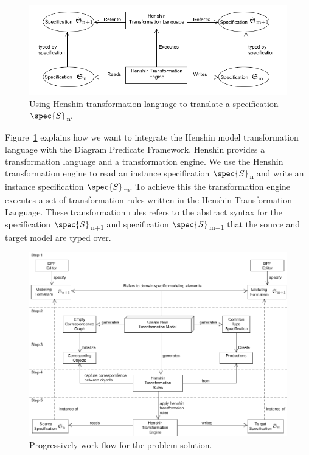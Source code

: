 \begin{figure}[H]
	\centering
	\includegraphics[scale=0.7]{./Figures/TransformationSolutionBasic.png}
	\caption[Integrating Henshin with DPF]
	{Using Henshin transformation language to translate a specification
	$\spec{S}$\textsubscript{n}.}
	\label{fig:Simple_Solution}
\end{figure}


Figure~\ref{fig:Simple_Solution} explains how we want to integrate the Henshin
model transformation language with the Diagram Predicate Framework. Henshin
provides a transformation language and a transformation engine. We
use the Henshin transformation engine to read an instance specification
$\spec{S}$\textsubscript{n} and write an instance specification
$\spec{S}$\textsubscript{m}. To achieve this the transformation engine executes
a set of transformation rules written in the Henshin Transformation Language.
These transformation rules refers to the abstract syntax for the
specification $\spec{S}$\textsubscript{n+1} and specification
$\spec{S}$\textsubscript{m+1} that the source and target model are typed over.


\begin{figure}[H]
	\centering
	\includegraphics[scale=0.65]{./Figures/flowchart_v2.png}
	\caption[Work flow for the solution]
	{Progressively work flow for the problem solution.}
	\label{fig:work_flow_solution}
\end{figure}

